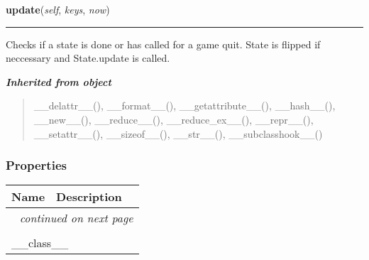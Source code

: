     \vspace{0.5ex}

\hspace{.8\funcindent}\begin{boxedminipage}{\funcwidth}

    \raggedright \textbf{update}(\textit{self}, \textit{keys}, \textit{now})

    \vspace{-1.5ex}

    \rule{\textwidth}{0.5\fboxrule}
\setlength{\parskip}{2ex}
    Checks if a state is done or has called for a game quit. State is 
    flipped if neccessary and State.update is called.

\setlength{\parskip}{1ex}
    \end{boxedminipage}


\large{\textbf{\textit{Inherited from object}}}

\begin{quote}
\_\_delattr\_\_(), \_\_format\_\_(), \_\_getattribute\_\_(), \_\_hash\_\_(), \_\_new\_\_(), \_\_reduce\_\_(), \_\_reduce\_ex\_\_(), \_\_repr\_\_(), \_\_setattr\_\_(), \_\_sizeof\_\_(), \_\_str\_\_(), \_\_subclasshook\_\_()
\end{quote}


  \subsubsection{Properties}

    \vspace{-1cm}
\hspace{\varindent}\begin{longtable}{|p{\varnamewidth}|p{\vardescrwidth}|l}
\cline{1-2}
\cline{1-2} \centering \textbf{Name} & \centering \textbf{Description}& \\
\cline{1-2}
\endhead\cline{1-2}\multicolumn{3}{r}{\small\textit{continued on next page}}\\\endfoot\cline{1-2}
\endlastfoot\multicolumn{2}{|l|}{\textit{Inherited from object}}\\
\multicolumn{2}{|p{\varwidth}|}{\raggedright \_\_class\_\_}\\
\cline{1-2}
\end{longtable}

